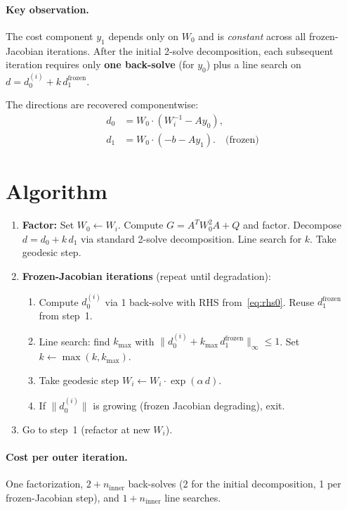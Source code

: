 \documentclass{article}
\begin{document}
\paragraph{Key observation.}
The cost component $y_1$ depends only on $W_0$ and is \emph{constant}
across all frozen-Jacobian iterations.  After the initial 2-solve
decomposition, each subsequent iteration requires only \textbf{one
back-solve} (for $y_0$) plus a line search on
$d = d_0^{(i)} + k\,d_1^{\text{frozen}}$.

The directions are recovered componentwise:
\begin{align}
  d_0 &= W_0 \cdot (W_i^{-1} - A y_0), \\
  d_1 &= W_0 \cdot (-b - A y_1). \quad \text{(frozen)}
\end{align}

\section{Algorithm}

\begin{enumerate}
\item \textbf{Factor:} Set $W_0 \leftarrow W_i$.  Compute $G = A^T W_0^2 A + Q$
  and factor.  Decompose $d = d_0 + k\,d_1$ via standard 2-solve decomposition.
  Line search for $k$.  Take geodesic step.
\item \textbf{Frozen-Jacobian iterations} (repeat until degradation):
  \begin{enumerate}
  \item Compute $d_0^{(i)}$ via 1 back-solve with RHS from~\eqref{eq:rhs0}.
    Reuse $d_1^{\text{frozen}}$ from step~1.
  \item Line search: find $k_{\max}$ with
    $\|d_0^{(i)} + k_{\max}\,d_1^{\text{frozen}}\|_\infty \le 1$.
    Set $k \leftarrow \max(k, k_{\max})$.
  \item Take geodesic step $W_i \leftarrow W_i \cdot \exp(\alpha\, d)$.
  \item If $\|d_0^{(i)}\|$ is growing (frozen Jacobian degrading), exit.
  \end{enumerate}
\item Go to step~1 (refactor at new $W_i$).
\end{enumerate}

\paragraph{Cost per outer iteration.}
One factorization, $2 + n_{\text{inner}}$ back-solves (2 for the initial
decomposition, 1 per frozen-Jacobian step), and $1 + n_{\text{inner}}$
line searches.
\end{document}
